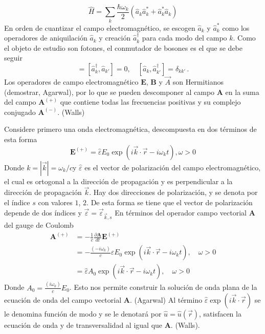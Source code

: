 \begin{equation}
  \label{EM.22}
  \hat{H} = \sum_{k} \frac{\hbar\omega_{k}}{2}\left(\hat{a}_{k}\hat{a}^{*}_{k} + \hat{a}_{k}^{*} \hat{a}_{k} \right)
\end{equation}
En orden de cuantizar el campo electromagnético, se escogen $\hat{a}_{k}$ y $\hat{a}^{*}_{k}$ como los operadores de aniquilaci\'on $\hat{a}_{k}$ y creaci\'on $\hat{a}^{\dagger}_{k}$ para cada modo del campo $k$. Como el objeto de estudio son fotones, el conmutador de bosones es el que se debe seguir
\begin{equation*}
  [\hat{a}_k, \hat{a}^{\dagger}_{k'}] = [\hat{a}^{\dagger}_k, \hat{a}_{k'}] = 0, \quad [\hat{a}_k, \hat{a}_{k'}^{\dagger}] = \delta_{kk'} \,.
\end{equation*}
\iffalse
  Los operadores de campo electromagnético $\mathbf{E}$, $\mathbf{B}$ y $\vec{A}$ son Hermitianos (demostrar, Agarwal), por lo que se pueden descomponer al campo $\mathbf{A}$ en la suma del campo $\mathbf{A}^{(+)}$ que contiene todas las frecuencias positivas  y su complejo conjugado $\mathbf{A}^{(-)}$. (Walls)

  Considere primero una onda electromagnética, descompuesta en dos términos de esta forma
  \begin{equation*}
    \mathbf{E}^{(+)} = \hat{\varepsilon} E_0 \exp{\left(i\vec{k}\cdot \vec{r} - i\omega_k t\right)}, \omega > 0
  \end{equation*}
  Donde $k = |\vec{k}| = \omega_k/c$y $\hat{\varepsilon}$ es el vector de polarización del campo electromagnético, el cual es ortogonal a la dirección de propagación y es perpendicular a la dirección de propagación $\vec{k}$. Hay dos direcciones de polarización, y se denota por el índice $s$ con valores $1$, $2$. De esta forma se tiene que el vector de polarización depende de dos índices y $\vec{\varepsilon} = \vec{\varepsilon}_{\vec{k},s}$ En términos del operador campo vectorial $\mathbf{A}$ del gauge de Coulomb
  \begin{align*}
    \mathbf{A}^{(+)} & = -\frac{1}{c}\frac{\partial \mathbf{A}}{dt} \mathbf{E}^{(+)}                                                           \\
                     & = -\frac{(-i\omega_k)}{c}\hat{\varepsilon} E_0 \exp{\left(i\vec{k}\cdot \vec{r} - i\omega_k t\right)}, \quad \omega > 0 \\
                     & = \hat{\varepsilon} A_0 \exp{\left(i\vec{k}\cdot \vec{r} - i\omega_k t\right)}, \quad \omega > 0
  \end{align*}
  Donde $A_0=\frac{(i\omega_k)}{c}E_0$. Esto nos permite construir la solución de onda plana de la ecuación de onda del campo vectorial $\mathbf{A}$. (Agarwal) Al término $\hat{\varepsilon} \exp{\left(i\vec{k}\cdot \vec{r}\right)}$ se le denomina función de modo y se le denotará por $\hat{u} = \hat{u}(\vec{r})$, satisfacen la ecuación de onda y de transversalidad al igual que $\mathbf{A}$. (Walls).

